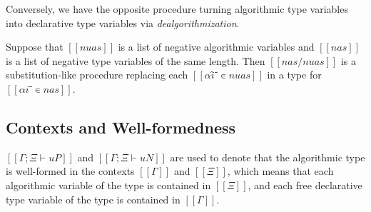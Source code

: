 \documentclass[acmsmall,natbib=false,review,anonymous]{acmart}
\begin{document}
Conversely, we have the opposite procedure turning algorithmic type variables
into declarative type variables via \emph{dealgorithmization}.

\begin{definition}
  Suppose that $[[nuas]]$ is a list of negative algorithmic variables
  and $[[nas]]$ is a list of negative type variables of the same length. 
  Then $[[ nas/nuas ]]$ is a substitution-like procedure replacing each
  $[[αî⁻ ∊ {nuas}]]$ in a type for $[[αi⁻ ∊ {nas}]]$.
\end{definition}


\subsection{Contexts and Well-formedness}


$[[Γ ; Ξ ⊢ uP]]$ and $[[Γ ; Ξ ⊢ uN]]$ are used to denote
that the algorithmic type is well-formed in the contexts
$[[Γ]]$ and $[[Ξ]]$, which means that each algorithmic variable
of the type is contained in $[[Ξ]]$, and each free declarative type variable
of the type is contained in $[[Γ]]$.

\begin{algorithm}
  \hfill
  
  \begin{multicols}{2}
  \ottdefnWFATNauWFLabeled{}
  \columnbreak

  \ottdefnWFATPauWFLabeled{}
  \end{multicols}

\end{algorithm}
\end{document}
